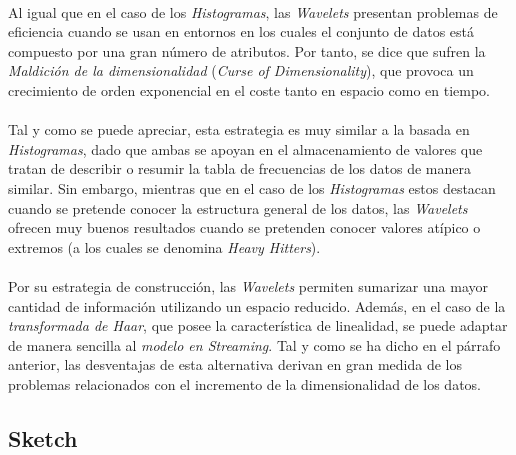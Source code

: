 \documentclass{subfiles}
\begin{document}
        \paragraph{}
        Al igual que en el caso de los \emph{Histogramas}, las \emph{Wavelets} presentan problemas de eficiencia cuando se usan en entornos en los cuales el conjunto de datos está compuesto por una gran número de atributos. Por tanto, se dice que sufren la \emph{Maldición de la dimensionalidad} (\emph{Curse of Dimensionality}), que provoca un crecimiento de orden exponencial en el coste tanto en espacio como en tiempo.

        \paragraph{}
        Tal y como se puede apreciar, esta estrategia es muy similar a la basada en \emph{Histogramas}, dado que ambas se apoyan en el almacenamiento de valores que tratan de describir o resumir la tabla de frecuencias de los datos de manera similar. Sin embargo, mientras que en el caso de los \emph{Histogramas} estos destacan cuando se pretende conocer la estructura general de los datos, las \emph{Wavelets} ofrecen muy buenos resultados cuando se pretenden conocer valores atípico o extremos (a los cuales se denomina \emph{Heavy Hitters}).

        \paragraph{}
        Por su estrategia de construcción, las \emph{Wavelets} permiten sumarizar una mayor cantidad de información utilizando un espacio reducido. Además, en el caso de la \emph{transformada de Haar}, que posee la característica de linealidad, se puede adaptar de manera sencilla al \emph{modelo en Streaming}. Tal y como se ha dicho en el párrafo anterior, las desventajas de esta alternativa derivan en gran medida de los problemas relacionados con el incremento de la dimensionalidad de los datos.

      \subsection{Sketch}
      \label{sec:sketch}
\end{document}
